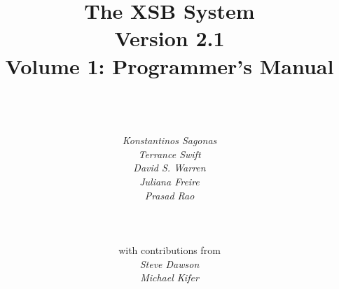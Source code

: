 \documentclass[11pt]{report}
\newcommand{\version}{Version 2.1}
\begin{document}
\title{\bf The XSB System \\ \version \\ Volume 1: Programmer's Manual}

\author{{\epsfxsize=230pt }\\
        \ \\ \ \\
        {\em Konstantinos Sagonas} \\
        {\em Terrance Swift} \\
        {\em David S. Warren} \\ 
        {\em Juliana Freire} \\
        {\em Prasad Rao} \\
        \ \\ \\ \\
        {\normalsize with contributions from} \\
        {\em Steve Dawson} \\
        {\em Michael Kifer} \\
        \ \\
} 


\maketitle

\thispagestyle{empty}

\newpage
\thispagestyle{empty}
%

\tableofcontents
\newpage        %
  











%
%
%
%
%

%

\appendix



%

%




\printindex
\end{document}
